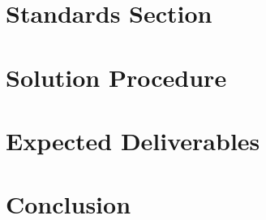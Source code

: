 \documentclass[a4paper,12pt]{article}
\begin{document}
	

\section{Standards Section}


\section{Solution Procedure}


\section{Expected Deliverables}


\section{Conclusion}

\newpage
\begin{appendices}
	
		
		

	
\end{appendices}
\end{document}
